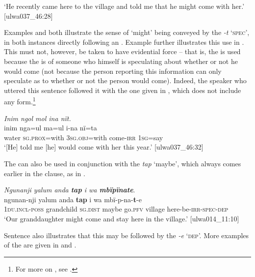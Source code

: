 \glt `He recently came here to the village and told me that he might come with her.’ [ulwa037\_46:28]
\z

Examples  and  both illustrate the sense of ‘might’ being conveyed by the   \textit{-t} ‘\textsc{spec}’, in both instances directly following an  . Example  further illustrates this use in . This must not, however, be taken to have  evidential force -- that is, the  is used because the  is of someone who himself is speculating about whether or not he would come (not because the person reporting this information can only speculate as to whether or not the person would come). Indeed, the speaker who uttered this sentence followed it with the one given in , which does not include any  form.\footnote{For more on , see .}

\ea%
    \label{ex:verbs:73}
          \textit{Inim ngol mol ina nït.}\\
\gll    inim  nga=ul     ma=ul       i-na    nï=ta\\
    water  \textsc{sg.prox}=with  3\textsc{sg.obj}=with   come-\textsc{irr}  1\textsc{sg}=say\\
\glt `[He] told me [he] would come with her this year.’ [ulwa037\_46:32]
\z

  The   can also be used in conjunction with the  \textit{tap} ‘maybe’, which always comes earlier in the clause, as in .

\ea%
    \label{ex:verbs:74}
\textit{Ngunanji yalum anda \textbf{tap} i wa \textbf{mbïpïnate}}.\\
\gll ngunan-nji      yalum    anda     \textbf{tap}   i     wa mbï-p-na-\textbf{t}-e\\
1\textsc{du.incl-poss}  grandchild  \textsc{sg.dist}  maybe  go.\textsc{pfv}  village 
  here-be-\textsc{irr-spec-dep}\\
\glt `Our granddaughter might come and stay here in the village.’ [ulwa014\_11:10]
\z

Sentence  also illustrates that this  may be followed by the  \textit{-e} ‘\textsc{dep}’. More examples of the   are given in  and .


